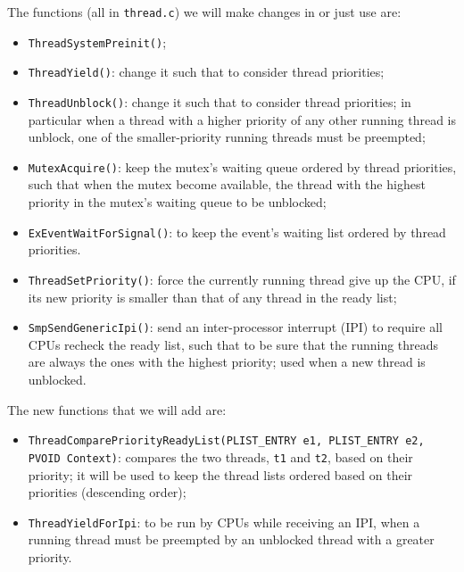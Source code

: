 The functions (all in \lstinline|thread.c|) we will make changes in or just use are:
\begin{itemize}
    \item \lstinline|ThreadSystemPreinit()|;
    
    \item \lstinline|ThreadYield()|: change it such that to consider thread priorities;
    
    \item \lstinline|ThreadUnblock()|: change it such that to consider thread priorities; in particular when a thread with a higher priority of any other running thread is unblock, one of the smaller-priority running threads must be preempted;

    \item \lstinline|MutexAcquire()|: keep the mutex's waiting queue ordered by thread priorities, such that when the mutex become available, the thread with the highest priority in the mutex's waiting queue to be unblocked;
    
    \item \lstinline|ExEventWaitForSignal()|: to keep the event's waiting list ordered by thread priorities.
    
    \item \lstinline|ThreadSetPriority()|: force the currently running thread give up the CPU, if its new priority is smaller than that of any thread in the ready list;
    
    \item \lstinline|SmpSendGenericIpi()|: send an inter-processor interrupt (IPI) to require all CPUs recheck the ready list, such that to be sure that the running threads are always the ones with the highest priority; used when a new thread is unblocked.
\end{itemize}

The new functions that we will add are:
\begin{itemize}
    \item \lstinline|ThreadComparePriorityReadyList(PLIST_ENTRY e1, PLIST_ENTRY e2, PVOID Context)|: compares the two threads, \texttt{t1} and \texttt{t2}, based on their priority; it will be used to keep the thread lists ordered based on their priorities (descending order);
    
    \item \lstinline|ThreadYieldForIpi|: to be run by CPUs while receiving an IPI, when a running thread must be preempted by an unblocked thread with a greater priority.
\end{itemize}


